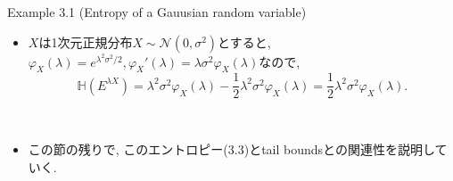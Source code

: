 \documentclass[aspectratio=169, dvipdfmx]{beamer}
\begin{document}
\begin{frame}
\begin{exampleblock}{Example 3.1 (Entropy of a Gauusian random variable)}
    \begin{itemize}
        \item $X$は1次元正規分布$X\sim \mathcal{N}(0, \sigma^2)$とすると, $\varphi_X(\lambda) = e^{\lambda^2\sigma^2/2}, \varphi_X'(\lambda) = \lambda \sigma^2\varphi_X(\lambda)$なので,
        \[ \mathbb{H}(E^{\lambda X}) = \lambda^2\sigma^2\varphi_X(\lambda) - \frac{1}{2}\lambda^2\sigma^2\varphi_X(\lambda) = \frac{1}{2}\lambda^2\sigma^2\varphi_X(\lambda). \tag{3.4}\]
    \end{itemize}
\end{exampleblock}
　\\
\begin{itemize}
    \item この節の残りで, このエントロピー(3.3)とtail boundsとの関連性を説明していく.
\end{itemize}
\end{frame}
\end{document}
